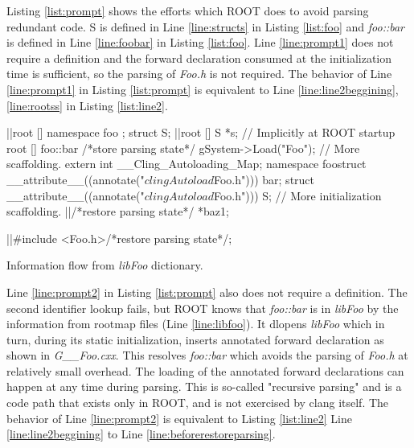 \documentclass{webofc}
\begin{document}
Listing \ref{list:prompt} shows the efforts which ROOT does to avoid parsing redundant code. S is defined in Line \ref{line:structs} in Listing \ref{list:foo} and {\it foo::bar} is defined in Line \ref{line:foobar} in Listing \ref{list:foo}. Line \ref{line:prompt1} does not require a definition and the forward declaration consumed at the initialization time is sufficient, so the parsing of {\it Foo.h} is not required. The behavior of Line \ref{line:prompt1} in Listing \ref{list:prompt} is equivalent to Line \ref{line:line2beggining}, \ref{line:rootss} in Listing \ref{list:line2}.

\begin{listing}[h]
    \noindent
    \begin{minipage}[h]{.7\textwidth}
    \begin{cppcode*}{}
    |\label{line:line2beggining}|root [] namespace foo { }; struct S;
    |\label{line:rootss}|root [] S *s; // Implicitly at ROOT startup
    root [] foo::bar /*store parsing state*/
    gSystem->Load("Foo");
    // More scaffolding.
    extern int __Cling_Autoloading_Map;
    namespace foo{struct __attribute__((annotate("$clingAutoload$Foo.h"))) bar;}
    struct __attribute__((annotate("$clingAutoload$Foo.h"))) S;
    // More initialization scaffolding.
    |\label{line:beforerestoreparsing}|/*restore parsing state*/ *baz1;
    
    |\label{line:restoreparsing}|#include <Foo.h>/*restore parsing state*/;
    \end{cppcode*}
    \end{minipage}
    \caption{Information flow from {\it libFoo} dictionary.}
    \label{list:line2}
\end{listing}

Line \ref{line:prompt2} in Listing \ref{list:prompt} also does not require a definition. The second identifier lookup fails, but ROOT knows that {\it foo::bar} is in {\it libFoo} by the information from rootmap files (Line \ref{line:libfoo}). It dlopens {\it libFoo} which in turn, during its static initialization, inserts annotated forward declaration as shown in {\it G\_\_Foo.cxx}. This resolves {\it foo::bar} which avoids the parsing of {\it Foo.h} at relatively small overhead. The loading of the annotated forward declarations can happen at any time during parsing. This is so-called "recursive parsing" and is a code path that exists only in ROOT, and is not exercised by clang itself. The behavior of Line \ref{line:prompt2} is equivalent to Listing \ref{list:line2} Line \ref{line:line2beggining} to Line \ref{line:beforerestoreparsing}.
\end{document}
